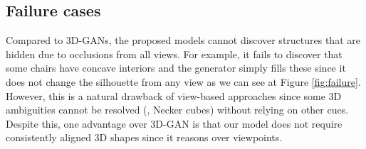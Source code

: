 \FloatBarrier

\subsection{Failure cases} 
Compared to 3D-GANs, the proposed \prgan models cannot discover structures that are hidden
due to occlusions from all views. For example, it fails to discover that some chairs have concave interiors and the generator simply fills these since it does not change the silhouette from any view as we can see at Figure
\ref{fig:failure}. 
However, this is a natural drawback of view-based approaches since
some 3D ambiguities cannot be resolved (\eg, Necker cubes) without
relying on other cues. Despite this, one advantage over 3D-GAN is that
our model does not require consistently aligned 3D shapes since it
reasons over viewpoints.
